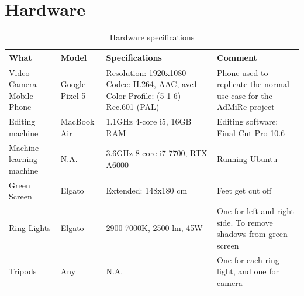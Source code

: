 \section{Hardware}\label{sec:hardware}
\begin{table}[H]
    \centering
    \begin{tabular}{|p{2cm}|p{1.5cm}|p{3.5cm}|p{3cm}|} 
         \hline
         \textbf{What} & \textbf{Model} & \textbf{Specifications} & \textbf{Comment} \\ [0.5ex] 
         \hline\hline
         Video Camera Mobile Phone & Google Pixel 5 & Resolution: 1920x1080 \newline Codec: H.264, AAC, avc1 \newline Color Profile: (5-1-6) \newline Rec.601 (PAL) & Phone used to replicate the normal use case for the AdMiRe project \\
         \hline
         Editing machine & MacBook Air & 1.1GHz 4-core i5, 16GB RAM & Editing software: Final Cut Pro 10.6 \\
         \hline
         Machine learning machine & N.A. & 3.6GHz 8-core i7-7700, RTX A6000 & Running Ubuntu \\
         \hline
         Green Screen & Elgato & Extended: 148x180 cm & Feet get cut off \\
         \hline
         Ring Lights & Elgato & 2900-7000K, 2500 lm, 45W & One for left and right side. To remove shadows from green screen \\
         \hline
         Tripods & Any & N.A. & One for each ring light, and one for camera \\ [1ex] 
         \hline
    \end{tabular}
    \caption{Hardware specifications}
    \label{tab:harware}
\end{table}